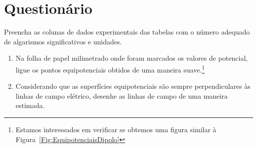 \cleardoublepage


\vspace{15mm}

\begin{fullwidth}
\noindent{}
\vspace{5mm}

\noindent{}

\noindent{}

\noindent{}

\noindent{}

\noindent{}
\end{fullwidth}

\vspace{5mm}

\section{Questionário}

\begin{question}[type={exam}]{2}
Preencha as colunas de dados experimentais das tabelas com o número adequado de algarismos significativos e unidades.
\end{question}

\begin{question}[type={exam}]{2}
\begin{enumerate}[label=\roman*.]
    \item Na folha de papel milimetrado onde foram marcados os valores de potencial, ligue os pontos equipotenciais obtidos de uma maneira suave.\footnote{Estamos interessados em verificar se obtemos uma figura similar à Figura~\ref{Fig:EquipotenciaisDipolo}}
    \item Considerando que as superfícies equipotenciais são sempre perpendiculares às linhas de campo elétrico, desenhe as linhas de campo de uma maneira estimada.
\end{enumerate}
\end{question}


